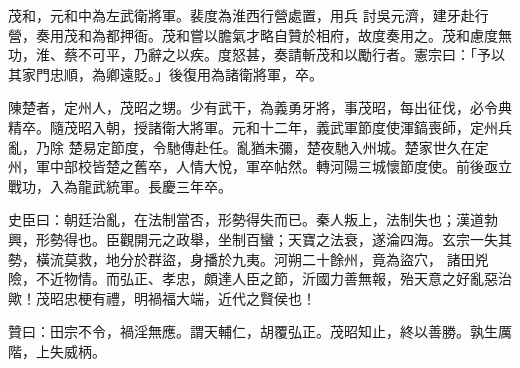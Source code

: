\begin{pinyinscope}
 茂和，元和中為左武衛將軍。裴度為淮西行營處置，用兵
 討吳元濟，建牙赴行營，奏用茂和為都押衙。茂和嘗以膽氣才略自贊於相府，故度奏用之。茂和慮度無功，淮、蔡不可平，乃辭之以疾。度怒甚，奏請斬茂和以勵行者。憲宗曰：「予以其家門忠順，為卿遠貶。」後復用為諸衛將軍，卒。



 陳楚者，定州人，茂昭之甥。少有武干，為義勇牙將，事茂昭，每出征伐，必令典精卒。隨茂昭入朝，授諸衛大將軍。元和十二年，義武軍節度使渾鎬喪師，定州兵亂，乃除
 楚易定節度，令馳傳赴任。亂猶未彌，楚夜馳入州城。楚家世久在定州，軍中部校皆楚之舊卒，人情大悅，軍卒帖然。轉河陽三城懷節度使。前後亟立戰功，入為龍武統軍。長慶三年卒。



 史臣曰：朝廷治亂，在法制當否，形勢得失而已。秦人叛上，法制失也；漢道勃興，形勢得也。臣觀開元之政舉，坐制百蠻；天寶之法衰，遂淪四海。玄宗一失其勢，橫流莫救，地分於群盜，身播於九夷。河朔二十餘州，竟為盜穴，
 諸田兇險，不近物情。而弘正、孝忠，頗達人臣之節，沂國力善無報，殆天意之好亂惡治歟！茂昭忠梗有禮，明禍福大端，近代之賢侯也！



 贊曰：田宗不令，禍淫無應。謂天輔仁，胡覆弘正。茂昭知止，終以善勝。孰生厲階，上失威柄。



\end{pinyinscope}
